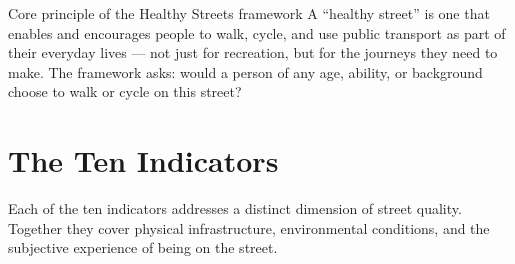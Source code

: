 \documentclass[11pt,a4paper,openany]{book}
\begin{document}
\begin{keybox}{Core principle of the Healthy Streets framework}
A ``healthy street'' is one that enables and encourages people to walk, cycle, and use public transport as part of their everyday lives --- not just for recreation, but for the journeys they need to make. The framework asks: would a person of any age, ability, or background choose to walk or cycle on this street?
\end{keybox}

\section{The Ten Indicators}

Each of the ten indicators addresses a distinct dimension of street quality. Together they cover physical infrastructure, environmental conditions, and the subjective experience of being on the street.
\end{document}
